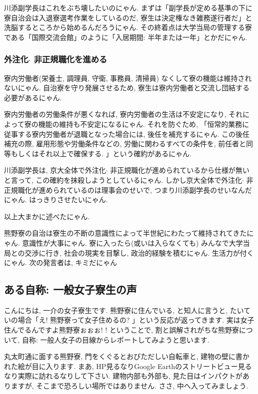 \documentclass[10pt,b5jsbook,dvips,dvipdfmx,openany]{jsbook}
\theoremstyle{definition}
\begin{document}
			川添副学長はこれをぶち壊したいのにゃん. まずは「副学長が定める基準の下に寮自治会は入退寮選考作業をしているのだ, 寮生は決定権なき雑務遂行者だ」と洗脳するところから始めるんだろうにゃん. その終着点は大学当局の管理する寮である「国際交流会館」のように「入居期間: 半年または一年」とかだにゃん.

			\subsubsection{外注化$ \cdot $ 非正規職化を進める}
			寮内労働者(栄養士, 調理員, 守衛, 事務員, 清掃員) なくして寮の機能は維持されないにゃん. 自治寮を守り発展させるため, 寮生は寮内労働者と交流し団結する必要があるにゃん.

			寮内労働者の労働条件が悪くなれば, 寮内労働者の生活は不安定になり, それによって寮の機能の維持も不安定になるにゃん. それを防ぐため, 「恒常的業務に従事する寮内労働者が退職となった場合には, 後任を補充するにゃん. この後任補充の際, 雇用形態や労働条件などの, 労働に関わるすべての条件を, 前任者と同等もしくはそれ以上で確保する. 」という確約があるにゃん.

			川添副学長は, 京大全体で外注化$ \cdot $ 非正規職化が進められているから仕様が無いと言って, この確約を抹殺しようとしているにゃん. しかし京大全体で外注化$ \cdot $ 非正規職化が進められているのは理事会のせいで, つまり川添副学長のせいなんだにゃん. はっきりさせたいにゃん.

 			以上大まかに述べたにゃん.

			熊野寮の自治は寮生の不断の意識性によって半世紀にわたって維持されてきたにゃん. 意識性が大事にゃん. 寮に入ったら(或いは入らなくても) みんなで大学当局との交渉に行き, 社会の現実を目撃し, 政治的経験を積むにゃん. 生活力が付くにゃん.
次の発言者は, キミだにゃん



		\subsection{ある自称: 一般女子寮生の声}

		こんにちは, 一介の女子寮生です. 熊野寮に住んでいる, と知人に言うと, たいていの場合「え! 熊野寮って女子住めるの? 」という反応が返ってきます. 実は女子住んでるんですよ熊野寮ぉぉぉ! ! ということで, 割と誤解されがちな熊野寮について, 自称: 一般人女子の目線からレポートしてみようと思います.

		丸太町通に面する熊野寮, 門をくぐるとおびただしい自転車と, 建物の壁に書かれた絵が目に入ります. まあ, HP見るなりGoogle Earthのストリートビュー見るなり実際に訪れるなりして下さい. 建物内部も外部も, 見た目はインパクトがありますが, そこまで恐ろしい場所ではありません. ささ, 中へ入ってみましょう.
\end{document}
